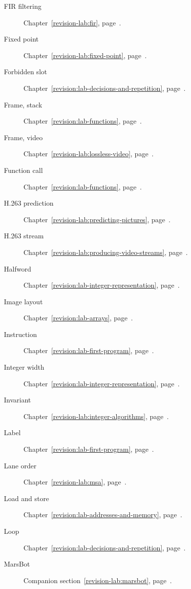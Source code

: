 \begin{description}
  \item[FIR filtering] Chapter~\ref{revision-lab:fir}, page~\pageref{revision-lab:fir}.
  \item[Fixed point] Chapter~\ref{revision-lab:fixed-point}, page~\pageref{revision-lab:fixed-point}.
  \item[Forbidden slot] Chapter~\ref{revision:lab-decisions-and-repetition}, page~\pageref{revision:lab-decisions-and-repetition}.
  \item[Frame, stack] Chapter~\ref{revision:lab-functions}, page~\pageref{revision:lab-functions}.
  \item[Frame, video] Chapter~\ref{revision-lab:lossless-video}, page~\pageref{revision-lab:lossless-video}.
  \item[Function call] Chapter~\ref{revision:lab-functions}, page~\pageref{revision:lab-functions}.
  \item[H.263 prediction] Chapter~\ref{revision-lab:predicting-pictures}, page~\pageref{revision-lab:predicting-pictures}.
  \item[H.263 stream] Chapter~\ref{revision-lab:producing-video-streams}, page~\pageref{revision-lab:producing-video-streams}.
  \item[Halfword] Chapter~\ref{revision:lab-integer-representation}, page~\pageref{revision:lab-integer-representation}.
  \item[Image layout] Chapter~\ref{revision:lab-arrays}, page~\pageref{revision:lab-arrays}.
  \item[Instruction] Chapter~\ref{revision:lab-first-program}, page~\pageref{revision:lab-first-program}.
  \item[Integer width] Chapter~\ref{revision:lab-integer-representation}, page~\pageref{revision:lab-integer-representation}.
  \item[Invariant] Chapter~\ref{revision-lab:integer-algorithms}, page~\pageref{revision-lab:integer-algorithms}.
  \item[Label] Chapter~\ref{revision:lab-first-program}, page~\pageref{revision:lab-first-program}.
  \item[Lane order] Chapter~\ref{revision-lab:msa}, page~\pageref{revision-lab:msa}.
  \item[Load and store] Chapter~\ref{revision:lab-addresses-and-memory}, page~\pageref{revision:lab-addresses-and-memory}.
  \item[Loop] Chapter~\ref{revision:lab-decisions-and-repetition}, page~\pageref{revision:lab-decisions-and-repetition}.
  \item[MarsBot] Companion section~\ref{revision-lab:marsbot}, page~\pageref{revision-lab:marsbot}.

\end{description}
